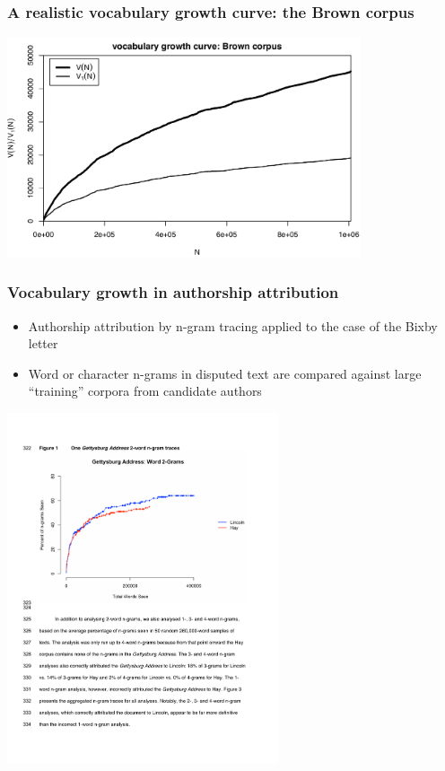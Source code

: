 \documentclass[t]{beamer} %
\begin{document}
\begin{frame}
  \frametitle{A realistic vocabulary growth curve: the Brown corpus}

  \ungap[1]
  \begin{center}
    \includegraphics[height=6.5cm]{../plots/tutorial_brown_vgc}%
  \end{center}
\end{frame}

\begin{frame}
  \frametitle{Vocabulary growth in authorship attribution}

  \ungap[1]
  \begin{itemize}
  \item Authorship attribution by n-gram tracing applied to the case of the Bixby letter \citep{Grieve:etc:18}
  \item Word or character n-grams in disputed text are compared against large ``training'' corpora from candidate authors
  \end{itemize}

  \begin{center}
    \includegraphics[width=8cm]{img/GrieveEtc2018_fig1}
  \end{center}
\end{frame}
\end{document}
